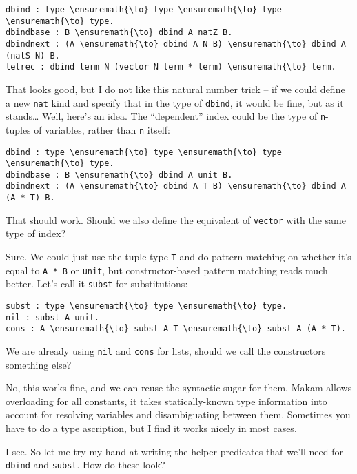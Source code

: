 \begin{verbatim}
dbind : type \ensuremath{\to} type \ensuremath{\to} type \ensuremath{\to} type. 
dbindbase : B \ensuremath{\to} dbind A natZ B.
dbindnext : (A \ensuremath{\to} dbind A N B) \ensuremath{\to} dbind A (natS N) B.
letrec : dbind term N (vector N term * term) \ensuremath{\to} term.
\end{verbatim}

\heroADVISOR{} That looks good, but I do not like this natural number trick --
if we could define a new \texttt{nat} kind and specify that in the type
of \texttt{dbind}, it would be fine, but as it stands\ldots{} Well,
here's an idea. The ``dependent'' index could be the type of
\texttt{n}-tuples of variables, rather than \texttt{n} itself:

\begin{verbatim}
dbind : type \ensuremath{\to} type \ensuremath{\to} type \ensuremath{\to} type.
dbindbase : B \ensuremath{\to} dbind A unit B.
dbindnext : (A \ensuremath{\to} dbind A T B) \ensuremath{\to} dbind A (A * T) B.
\end{verbatim}

\heroSTUDENT{} That should work. Should we also define the equivalent of
\texttt{vector} with the same type of index?

\heroADVISOR{} Sure. We could just use the tuple type \texttt{T} and do
pattern-matching on whether it's equal to \texttt{A\ *\ B} or
\texttt{unit}, but constructor-based pattern matching reads much better.
Let's call it \texttt{subst} for substitutions:

\begin{verbatim}
subst : type \ensuremath{\to} type \ensuremath{\to} type.
nil : subst A unit.
cons : A \ensuremath{\to} subst A T \ensuremath{\to} subst A (A * T).
\end{verbatim}

\heroSTUDENT{} We are already using \texttt{nil} and \texttt{cons} for lists,
should we call the constructors something else?

\heroADVISOR{} No, this works fine, and we can reuse the syntactic sugar for
them. Makam allows overloading for all constants, it takes
statically-known type information into account for resolving variables
and disambiguating between them. Sometimes you have to do a type
ascription, but I find it works nicely in most cases.

\heroSTUDENT{} I see. So let me try my hand at writing the helper predicates
that we'll need for \texttt{dbind} and \texttt{subst}. How do these
look?

